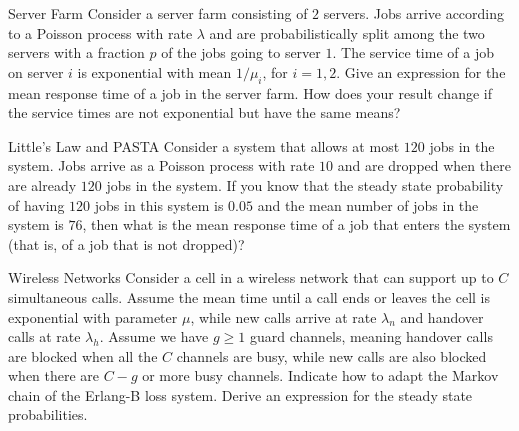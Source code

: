 \begin{problem}{Server Farm}
Consider a server farm consisting of $2$ servers. Jobs arrive according to a Poisson process with rate $\lambda$ and are probabilistically split among the two servers with a fraction $p$ of the jobs going to server $1$. The service time of a job on server $i$ is exponential with mean $1/\mu_i$, for $i = 1, 2$. Give an expression for the mean response time of a job in the server farm. How does your result change if the service times are
not exponential but have the same means?
\end{problem}

\begin{problem}{Little's Law and PASTA}
Consider a system that allows at most $120$ jobs in the system. Jobs arrive as a Poisson process with rate $10$ and are dropped when there are already $120$ jobs in the system. If you know that the steady state probability of having $120$ jobs in this system is $0.05$ and the mean number of jobs in the system is $76$, then what is the mean response time of a job that enters the system (that is, of a job that is not dropped)?
\end{problem}

\begin{problem}{Wireless Networks}
Consider a cell in a wireless network that can support up to $C$ simultaneous calls. Assume the mean time until a call ends or leaves the cell is exponential with parameter $\mu$, while new calls arrive at rate $\lambda_n$ and handover calls at rate $\lambda_h$. Assume we have $g \geq 1$ guard channels, meaning handover calls are blocked when all the $C$ channels are busy, while new calls are also blocked when there are $C - g$ or more busy channels. Indicate how to adapt the Markov chain of the Erlang-B loss system. Derive an expression for the steady state probabilities.
\end{problem}

